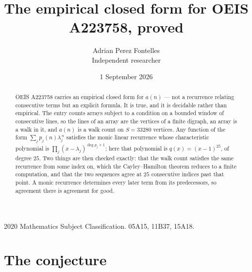 \documentclass[11pt,a4paper]{article}
\title{The empirical closed form for OEIS A223758, proved}
\author{Adrian Perez Fontelles\\ \small Independent researcher}
\date{1 September 2026}
\theoremstyle{plain}
\theoremstyle{definition}
\begin{document}
\maketitle

\begin{abstract}
OEIS A223758 carries an empirical closed form for $a(n)$ --- not a recurrence relating
consecutive terms but an explicit formula. It is true, and it is decidable rather than
empirical. The entry counts arrays subject to a condition on a bounded window of consecutive lines, so the lines of an array are the
vertices of a finite digraph, an array is a walk in it, and $a(n)$ is a walk count on
$S=33280$ vertices. Any function of the form $\sum_j p_j(n)\lambda_j^{\,n}$ satisfies the
monic linear recurrence whose characteristic polynomial is
$\prod_j(x-\lambda_j)^{\deg p_j+1}$; here that polynomial is $q(x)=(x-1)^{25}$, of degree
$25$. Two things are then checked exactly: that the walk count satisfies the same
recurrence from some index on, which the Cayley--Hamilton theorem reduces to a finite
computation, and that the two sequences agree at $25$ consecutive indices past that
point. A monic recurrence determines every later term from its predecessors, so agreement
there is agreement for good.
\end{abstract}

\noindent\small 2020 Mathematics Subject Classification. 05A15, 11B37, 15A18.\normalsize

\section{The conjecture}
\end{document}
